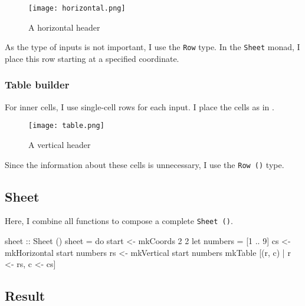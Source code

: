 \begin{figure}[h]
  \centering
  \texttt{[image: horizontal.png]}
  \caption{A horizontal header}
  \label{fig:horizontal}
\end{figure}

As the type of inputs is not important, I use the \texttt{Row} type.
In the \texttt{Sheet} monad, I place this row starting at a specified coordinate.


\subsubsection{Table builder}

For inner cells, I use single-cell rows for each input. I place the cells as in .

\begin{figure}[h]
  \centering
  \texttt{[image: table.png]}
  \caption{A vertical header}
  \label{fig:table}
\end{figure}

\pagebreak
Since the information about these cells is unnecessary, I use the \texttt{Row ()} type.


\subsection{Sheet}

Here, I combine all functions to compose a complete \texttt{Sheet ()}.

\begin{mycode}
sheet :: Sheet ()
sheet = do
  start <- mkCoords 2 2
  let numbers = [1 .. 9]
  cs <- mkHorizontal start numbers
  rs <- mkVertical start numbers
  mkTable [(r, c) | r <- rs, c <- cs]
\end{mycode}

\subsection{Result}

